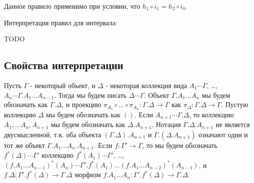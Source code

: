\documentclass{amsart}
\theoremstyle{definition}
\theoremstyle{remark}
\numberwithin{figure}{section}
\begin{document}
Данное правило применимо при условии, что $h_1 \circ i_1 = h_2 \circ i_0$.

Интерпретация правил для интервала:

TODO

\begin{comment}
Пусть $\Gamma.A \xrightarrow{t} P(\Gamma.A) \xrightarrow{\langle p_1, p_2 \rangle} \Gamma.A \times \Gamma.A$ - объект путей для $\Gamma.A$.

Во-первых, определим $h'_1 : \Gamma \to P(\Gamma.A)$ как композицию $p \circ i_1$, где $p$ определяется следующим образом:
\[ \xymatrix{ \Gamma \ar[r]^-a \ar[d]_{i_0} & \Gamma.A \ar[r]^-t & P(\Gamma.A) \ar[d]^{\langle p_1, p_2 \rangle} \\
              \Gamma \times I' \ar[rr]_-{\langle a \circ \pi_1, h_1 \rangle} \ar@{-->}[urr]^p & & \Gamma.A \times \Gamma.A
            }\]
Во-вторых, определим $h'_3 : \Gamma \to P(\Gamma.A)$ как композицию $q \circ i_1$, где $q$ определяется следующим образом:
\[ \xymatrix{ \Gamma \ar[rr]^{h'_1} \ar[d]_{i_0}                  & & P(\Gamma.A) \ar[d]^{\langle p_1, p_2 \rangle} \\
              \Gamma \times I' \ar[rr]_-{\langle a \circ \pi_1, h_2 \rangle} \ar@{-->}[urr]^q & & \Gamma.A \times \Gamma.A
            }\]
Теперь определим $h_3 : \Gamma \times I' \to \Gamma.A$ как композицию $p_2 \circ s$, где $s$ определяется следующим образом:
\[ \xymatrix{ \Gamma \amalg \Gamma \ar[rr]^{[t \circ a, h'_3]} \ar[d] & & P(\Gamma.A) \ar[d]^{p_1} \\
              \Gamma \times I' \ar[r]_-{\pi_1} \ar@{-->}[urr]^s & \Gamma \ar[r]_-a & \Gamma.A
            }\]
\end{comment}

\subsection{Свойства интерпретации}

Пусть $\Gamma$ - некоторый объект, и $\Delta$ - некоторая коллекция вида $A_1 \dotsb \Gamma$, \ldots, $A_n \dotsb \Gamma.A_1 \ldots A_{n-1}$.
Тогда мы будем писать $\Delta \dotsb \Gamma$.
Объект $\Gamma.A_1 \ldots A_n$ мы будем обозначать как $\Gamma.\Delta$,
    и проекцию $\pi_{A_1} \circ \ldots \circ \pi_{A_n} : \Gamma.\Delta \to \Gamma$ как $\pi_\Delta : \Gamma.\Delta \to \Gamma$.
Пустую коллекцию $\Delta$ мы будем обозначать как $()$.
Если $A_{n+1} \dotsb \Gamma.\Delta$, то коллекцию $A_1, \ldots A_n, A_{n+1}$ мы будем обозначать как $\Delta.A_{n+1}$.
Нотация $\Gamma.\Delta.A_{n+1}$ не является двусмысленной, т.к. оба объекта $(\Gamma.\Delta).A_{n+1}$ и $\Gamma.(\Delta.A_{n+1})$ означают один и тот же объект $\Gamma.A_1 \ldots A_n.A_{n+1}$.
Если $f : \Gamma' \to \Gamma$, то мы будем обозначать $f^*(\Delta) \dotsb \Gamma'$ коллекцию $f^*(A_1) \dotsb \Gamma'$, \ldots, $(f.A_1 \ldots A_{n-1})^*(A_n) \dotsb \Gamma'.f^*(A_1) \ldots (f.A_1 \ldots A_{n-2})^*(A_{n-1})$,
    и $f.\Delta : \Gamma'.f^*(\Delta) \to \Gamma.\Delta$ морфизм $f.A_1 \ldots A_n : \Gamma'.f^*(\Delta) \to \Gamma.\Delta$.
\end{document}
